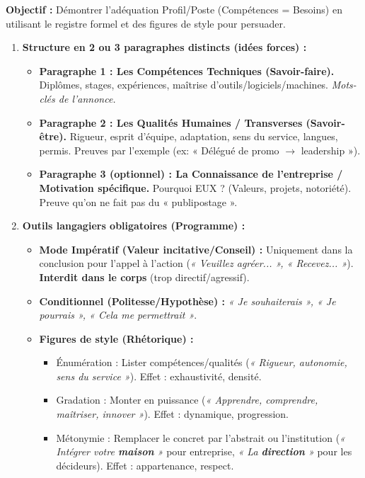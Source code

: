 \documentclass[11pt]{article}
\newcommand{\cle}[1]{{\popxbold\color{popdark}#1}}
\begin{document}
\begin{methode}
    \textbf{Objectif :} Démontrer l'adéquation Profil/Poste (Compétences = Besoins) en utilisant le registre formel et des figures de style pour persuader.
    \begin{enumerate}
        \item \textbf{Structure en 2 ou 3 paragraphes distincts (idées forces) :}
            \begin{itemize}
                \item \textbf{Paragraphe 1 : Les Compétences Techniques (Savoir-faire).} Diplômes, stages, expériences, maîtrise d'outils/logiciels/machines. \emph{Mots-clés de l'annonce.}
                \item \textbf{Paragraphe 2 : Les Qualités Humaines / Transverses (Savoir-être).} Rigueur, esprit d'équipe, adaptation, sens du service, langues, permis. Preuves par l'exemple (ex: « Délégué de promo $\rightarrow$ leadership »).
                \item \textbf{Paragraphe 3 (optionnel) : La Connaissance de l'entreprise / Motivation spécifique.} Pourquoi EUX ? (Valeurs, projets, notoriété). Preuve qu'on ne fait pas du « publipostage ».
            \end{itemize}
        \item \textbf{Outils langagiers obligatoires (Programme) :}
            \begin{itemize}
                \item \textbf{Mode Impératif (Valeur incitative/Conseil) :} Uniquement dans la conclusion pour l'appel à l'action (\textit{« Veuillez agréer... », « Recevez... »}). \textbf{Interdit dans le corps} (trop directif/agressif).
                \item \textbf{Conditionnel (Politesse/Hypothèse) :} \textit{« Je souhaiterais », « Je pourrais », « Cela me permettrait »}.
                \item \textbf{Figures de style (Rhétorique) :}
                    \begin{itemize}
                        \item \cle{Énumération} : Lister compétences/qualités (\textit{« Rigueur, autonomie, sens du service »}). Effet : exhaustivité, densité.
                        \item \cle{Gradation} : Monter en puissance (\textit{« Apprendre, comprendre, maîtriser, innover »}). Effet : dynamique, progression.
                        \item \cle{Métonymie} : Remplacer le concret par l'abstrait ou l'institution (\textit{« Intégrer votre \textbf{maison} »} pour entreprise, \textit{« La \textbf{direction} »} pour les décideurs). Effet : appartenance, respect.

\end{itemize}
\end{itemize}
\end{enumerate}
\end{methode}
\end{document}
